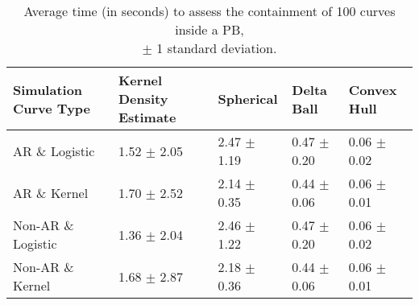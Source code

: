 \begin{table}[ht!]
\centering
\caption{Average time (in seconds) to assess the containment of 100 curves inside a PB, \\ \(\pm\) 1 standard deviation.} 
\label{tab:time_prediction100}
\begin{tabular}{R{1.4in}L{1.1in}L{.95in}L{.95in}L{.95in}}
  \hline
\hline
Simulation Curve Type & Kernel Density Estimate & Spherical & Delta Ball & Convex Hull \\ 
  \hline
AR \& Logistic & 1.52 \(\pm\) 2.05 & 2.47 \(\pm\) 1.19 & 0.47 \(\pm\) 0.20 & 0.06 \(\pm\) 0.02 \\ 
  AR \& Kernel & 1.70 \(\pm\) 2.52 & 2.14 \(\pm\) 0.35 & 0.44 \(\pm\) 0.06 & 0.06 \(\pm\) 0.01 \\ 
  Non-AR \& Logistic & 1.36 \(\pm\) 2.04 & 2.46 \(\pm\) 1.22 & 0.47 \(\pm\) 0.20 & 0.06 \(\pm\) 0.02 \\ 
  Non-AR \& Kernel & 1.68 \(\pm\) 2.87 & 2.18 \(\pm\) 0.36 & 0.44 \(\pm\) 0.06 & 0.06 \(\pm\) 0.01 \\ 
   \hline
\end{tabular}
\end{table}
